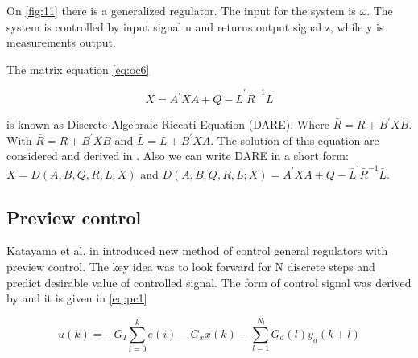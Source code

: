 \documentclass[12pt,a4paper]{report}
\begin{document}
			On \cref{fig:11} there is a generalized regulator. The input for the system is $\omega$. The system is controlled by input signal u and returns output signal z, while y is measurements output.
			
			The matrix equation \ref{eq:oc6}
			
			\begin{equation}\label{eq:oc6}
				X = A^{'}XA + Q - \bar{L}^{'} \bar{R}^{-1} \bar{L}
			\end{equation}
			
			is known as Discrete Algebraic Riccati Equation (DARE). Where $\bar{R} = R + B^{'}XB$. With $\bar{R} = R + B^{'}XB$ and $\bar{L} = L + B^{'}XA$. The solution of this equation are considered and derived in \cite{hazell2008discrete}. Also we can write DARE in a short form: $X = D(A,B,Q,R,L;X)$ and $D(A,B,Q,R,L;X) = A^{'} XA + Q -  \bar{L}^{'} \bar{R}^{-1} \bar{L}$.
		
		\subsection{Preview control} 
			Katayama et al. in \cite{katayama1985design} introduced new method of control general regulators with preview control. The key idea was to look forward for N discrete steps and predict desirable value of controlled signal. The form of control signal was derived by \cite{katayama1985design} and it is given in \ref{eq:pc1}
			
			\begin{equation}\label{eq:pc1}
				u(k) = -G_I \sum^{k}_{i=0} e(i) - G_xx(k) - \sum^{N_l}_{l=1}G_d(l)y_d(k+l)
			\end{equation}
		
\end{document}
